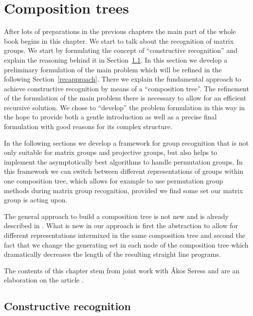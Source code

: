 
\chapter{Composition trees}
\label{chap:comptree}
%

After lots of preparations in the previous chapters
the main part of the whole book begins in this chapter. We start to talk
about the recognition of matrix groups. We start by formulating
the concept of ``constructive recognition'' and explain the reasoning
behind it in Section~\ref{constrrecog}. In this section we develop
a preliminary formulation of the main problem which will be refined
in the following Section~\ref{recapproach}. There we explain the fundamental
approach to achieve
constructive recognition by means of a ``composition tree''.
The refinement of the formulation of the main
problem there is necessary to allow for an efficient recursive solution.
We chose to ``develop'' the problem formulation in this way in the hope
to provide both a gentle introduction as well as a precise final
formulation with good reasons for its complex structure.

In the following sections we develop a
framework for group recognition that is not only suitable for matrix
groups and projective groups, but also helps to implement
the asymptotically best algorithms to handle permutation groups. In
this framework we can switch between different representations of
groups within one composition tree, which allows for example to use 
%
permutation group methods during matrix group recognition, provided
we find some set our matrix group is acting upon.

The general approach to build a composition tree is not new and is
already described in \cite{MatGrpProj}. What is new in our approach
is first the abstraction to allow for different representations
intermixed in the same composition tree and second the fact that
we change the generating set in each node of the composition tree
which dramatically decreases the length of the resulting straight
line programs. 
%

The contents of this chapter stem from joint work with \'Akos Seress
and are an elaboration on the article \cite{AkosMaxISSAC}.

\section{Constructive recognition}
\label{constrrecog}

